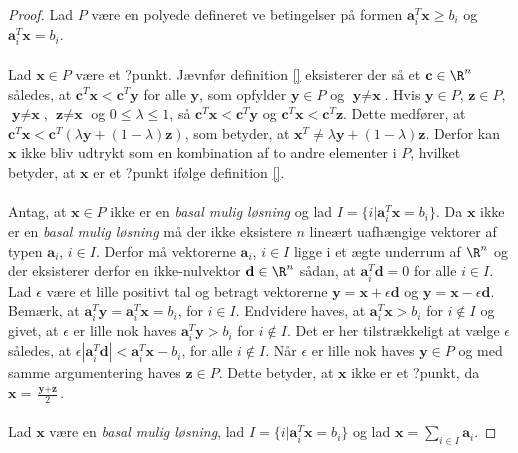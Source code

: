 %
\begin{proof}
Lad $P$ være en polyede defineret ve betingelser på formen $\textbf{a}_i^T\textbf{x} \geq b_i$ og $\textbf{a}_i^T\textbf{x} = b_i$.\\\\
%
Lad $\textbf{x} \in P$ være et ?punkt. Jævnfør definition \ref{} eksisterer der så et $\textbf{c} \in \R^n$ således, at $\textbf{c}^T\textbf{x} < \textbf{c}^T\textbf{y}$ for alle $\textbf{y}$, som opfylder $\textbf{y} \in P$ og $\textbf{y} \neq \textbf{x}$.
Hvis $\textbf{y} \in P$, $\textbf{z} \in P$, $\textbf{y} \neq \textbf{x}$, $\textbf{z} \neq \textbf{x}$ og $0 \leq \lambda \leq 1$, så $\textbf{c}^T\textbf{x} < \textbf{c}^T\textbf{y}$ og $\textbf{c}^T\textbf{x} < \textbf{c}^T\textbf{z}$.
Dette medfører, at $\textbf{c}^T\textbf{x} < \textbf{c}^T(\lambda \textbf{y} + (1-\lambda)\textbf{z})$, som betyder, at $\textbf{x}^T \neq \lambda \textbf{y} + (1 - \lambda)\textbf{z}$.
Derfor kan $\textbf{x}$ ikke bliv udtrykt som en kombination af to andre elementer i $P$, hvilket betyder, at $\textbf{x}$ er et ?punkt ifølge definition \ref{}.\\\\
%
Antag, at $\textbf{x} \in P$ ikke er en \textit{basal mulig løsning} og lad $I = \{ i | \textbf{a}_i^T \textbf{x} = b_i\}$.
Da $\textbf{x}$ ikke er en \textit{basal mulig løsning} må der ikke eksistere $n$ lineært uafhængige vektorer af typen $\textbf{a}_i$, $i \in I$.
Derfor må vektorerne $\textbf{a}_i$, $i \in I$ ligge i et ægte underrum af $\R^n$ og der eksisterer derfor en ikke-nulvektor $\textbf{d} \in \R^n$ sådan, at $\textbf{a}_i^T\textbf{d} = 0$ for alle $i \in I$.
Lad $\epsilon$ være et lille positivt tal og betragt vektorerne $\textbf{y} = \textbf{x} + \epsilon\textbf{d}$ og $\textbf{y} = \textbf{x} - \epsilon\textbf{d}$.
Bemærk, at $\textbf{a}_i^T \textbf{y} = \textbf{a}_i^T \textbf{x} = b_i$, for $i \in I$.
Endvidere haves, at $\textbf{a}_i^T \textbf{x} > b_i$ for $i \notin I$ og givet, at $\epsilon$ er lille nok haves $\textbf{a}_i^T \textbf{y} > b_i$ for $i \notin I$.
Det er her tilstrækkeligt at vælge $\epsilon$ således, at $\epsilon |\textbf{a}_i^T\textbf{d}| < \textbf{a}_i^T\textbf{x} - b_i$, for alle $i \notin I$.
Når $\epsilon$ er lille nok haves $\textbf{y} \in P$ og med samme argumentering haves $\textbf{z} \in P$.
Dette betyder, at $\textbf{x}$ ikke er et ?punkt, da $\textbf{x} = \frac{\textbf{y} + \textbf{z}}{2}$.\\\\
%
Lad $\textbf{x}$ være en \textit{basal mulig løsning}, lad $I = \{i | \textbf{a}_i^T\textbf{x} = b_i \}$ og lad $\textbf{x}=\sum_{i \in I} \textbf{a}_i$.

\end{proof}
